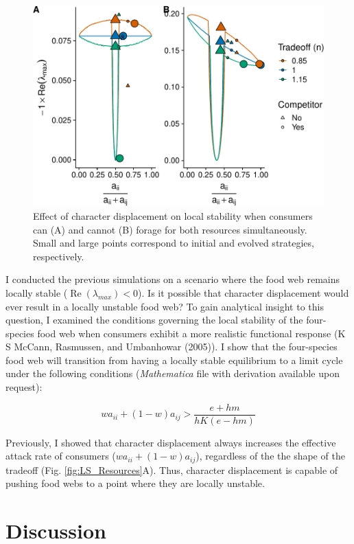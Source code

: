 \documentclass[11pt,]{article}
\begin{document}
\begin{figure}
\centering
\includegraphics{ECD_Supp_Mat_files/figure-latex/Stability-1.pdf}
\caption{\label{fig:Stability}Effect of character displacement on local
stability when consumers can (A) and cannot (B) forage for both
resources simultaneously. Small and large points correspond to initial
and evolved strategies, respectively.}
\end{figure}

I conducted the previous simulations on a scenario where the food web
remains locally stable (\(\operatorname{Re}(\lambda_{max})<0\)). Is it
possible that character displacement would ever result in a locally
unstable food web? To gain analytical insight to this question, I
examined the conditions governing the local stability of the
four-species food web when consumers exhibit a more realistic functional
response (K S McCann, Rasmussen, and Umbanhowar (2005)). I show that the
four-species food web will transition from having a locally stable
equilibrium to a limit cycle under the following conditions
(\emph{Mathematica} file with derivation available upon request):

\[wa_{ii}+(1-w)a_{ij} > \frac{e+hm}{hK(e-hm)}\]

Previously, I showed that character displacement always increases the
effective attack rate of consumers (\(wa_{ii}+(1-w)a_{ij}\)), regardless
of the the shape of the tradeoff (Fig. \ref{fig:LS_Resources}A). Thus,
character displacement is capable of pushing food webs to a point where
they are locally unstable.

\section{Discussion}\label{discussion}
\end{document}

